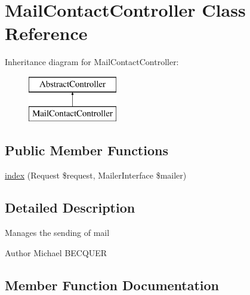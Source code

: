 \hypertarget{class_app_1_1_controller_1_1_mail_contact_controller}{}\section{Mail\+Contact\+Controller Class Reference}
\label{class_app_1_1_controller_1_1_mail_contact_controller}
Inheritance diagram for Mail\+Contact\+Controller\+:\begin{figure}[H]
\begin{center}
\leavevmode
\includegraphics[height=2.000000cm]{class_app_1_1_controller_1_1_mail_contact_controller}
\end{center}
\end{figure}
\subsection*{Public Member Functions}
\begin{DoxyCompactItemize}
\item 
\mbox{\hyperlink{class_app_1_1_controller_1_1_mail_contact_controller_a1032c2b90260e3c85df9691126800ff2}{index}} (Request \$request, Mailer\+Interface \$mailer)
\end{DoxyCompactItemize}


\subsection{Detailed Description}
Manages the sending of mail \begin{DoxyAuthor}{Author}
Michael B\+E\+C\+Q\+U\+ER 
\end{DoxyAuthor}


\subsection{Member Function Documentation}
\mbox{\label{class_app_1_1_controller_1_1_mail_contact_controller_a1032c2b90260e3c85df9691126800ff2}} 
